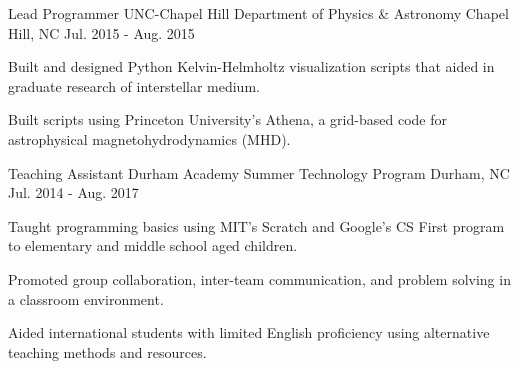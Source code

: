 

\begin{cventries}
  \cventry
    {\large Lead Programmer} %
    {UNC-Chapel Hill Department of Physics \& Astronomy} %
    {Chapel Hill, NC} %
    {Jul. 2015 - Aug. 2015} %
    {
      \begin{cvitems} %
        \item {Built and designed Python Kelvin-Helmholtz visualization scripts that aided in graduate research of interstellar medium.}
        \item {Built scripts using Princeton University's Athena, a grid-based code for astrophysical magnetohydrodynamics (MHD).}
      \end{cvitems}
    }
  \cventry
    {\large Teaching Assistant} %
    {Durham Academy Summer Technology Program} %
    {Durham, NC} %
    {Jul. 2014 - Aug. 2017} %
    {
      \begin{cvitems} %
        \item {Taught programming basics using MIT's Scratch and Google's CS First program to elementary and middle school aged children.}
        \item {Promoted group collaboration, inter-team communication, and problem solving in a classroom environment.}
        \item {Aided international students with limited English proficiency using alternative teaching methods and resources.}
      \end{cvitems}
    }


\end{cventries}
